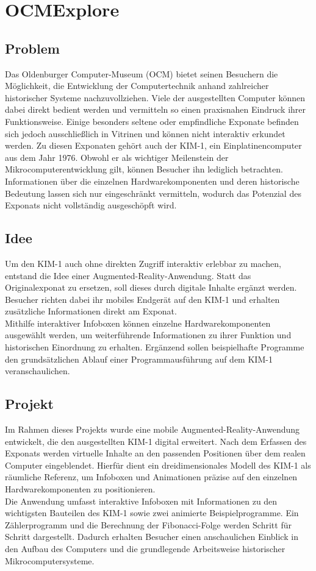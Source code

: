 \chapter{OCMExplore}

\section{Problem}
Das Oldenburger Computer-Museum (OCM) bietet seinen Besuchern die Möglichkeit, die Entwicklung der Computertechnik anhand zahlreicher historischer Systeme nachzuvollziehen. Viele der ausgestellten Computer können dabei direkt bedient werden und vermitteln so einen praxisnahen Eindruck ihrer Funktionsweise. Einige besonders seltene oder empfindliche Exponate befinden sich jedoch ausschließlich in Vitrinen und können nicht interaktiv erkundet werden. Zu diesen Exponaten gehört auch der KIM-1, ein Einplatinencomputer aus dem Jahr 1976. Obwohl er als wichtiger Meilenstein der Mikrocomputerentwicklung gilt, können Besucher ihn lediglich betrachten. Informationen über die einzelnen Hardwarekomponenten und deren historische Bedeutung lassen sich nur eingeschränkt vermitteln, wodurch das Potenzial des Exponats nicht vollständig ausgeschöpft wird.

\section{Idee}
Um den KIM-1 auch ohne direkten Zugriff interaktiv erlebbar zu machen, entstand die Idee einer Augmented-Reality-Anwendung. Statt das Originalexponat zu ersetzen, soll dieses durch digitale Inhalte ergänzt werden. Besucher richten dabei ihr mobiles Endgerät auf den KIM-1 und erhalten zusätzliche Informationen direkt am Exponat.\\Mithilfe interaktiver Infoboxen können einzelne Hardwarekomponenten ausgewählt werden, um weiterführende Informationen zu ihrer Funktion und historischen Einordnung zu erhalten. Ergänzend sollen beispielhafte Programme den grundsätzlichen Ablauf einer Programmausführung auf dem KIM-1 veranschaulichen.

\section{Projekt}
Im Rahmen dieses Projekts wurde eine mobile Augmented-Reality-Anwendung entwickelt, die den ausgestellten KIM-1 digital erweitert. Nach dem Erfassen des Exponats werden virtuelle Inhalte an den passenden Positionen über dem realen Computer eingeblendet. Hierfür dient ein dreidimensionales Modell des KIM-1 als räumliche Referenz, um Infoboxen und Animationen präzise auf den einzelnen Hardwarekomponenten zu positionieren.\\Die Anwendung umfasst interaktive Infoboxen mit Informationen zu den wichtigsten Bauteilen des KIM-1 sowie zwei animierte Beispielprogramme. Ein Zählerprogramm und die Berechnung der Fibonacci-Folge werden Schritt für Schritt dargestellt. Dadurch erhalten Besucher einen anschaulichen Einblick in den Aufbau des Computers und die grundlegende Arbeitsweise historischer Mikrocomputersysteme.

